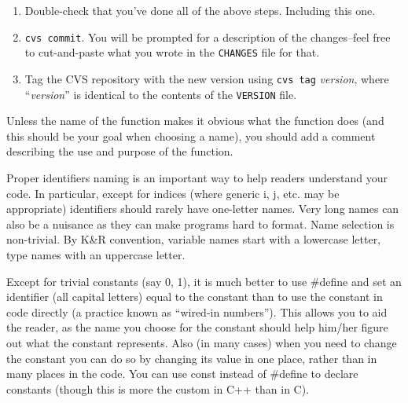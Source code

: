 \documentclass{article}
\begin{document}
\begin{enumerate}
   \item Double-check that you've done all of the above steps.  Including
      this one.

   \item \texttt{cvs commit}.  You will be prompted for a description of the
      changes--feel free to cut-and-paste what you wrote in the
      \texttt{CHANGES} file for that.

   \item Tag the CVS repository with the new version using \texttt{cvs tag} \textit{version}, where ``\textit{version}'' is identical to the contents of the \texttt{VERSION} file.
\end{enumerate}






  Unless the name of the function makes it obvious what the function
  does (and this should be your goal when choosing a name), you should
  add a comment describing the use and purpose of the function.

  Proper identifiers naming is an important way to help readers
  understand your code.  In particular, except for indices (where
  generic i, j, etc. may be appropriate) identifiers should rarely
  have one-letter names.  Very long names can also be a nuisance as
  they can make programs hard to format.  Name selection is
  non-trivial. By K\&R convention, variable names start with a
  lowercase letter, type names with an uppercase letter.

%
Except for trivial constants (say 0, 1), it is much better to use
\#define and set an identifier (all capital letters) equal to the
constant than to use the constant in code directly (a practice known
as “wired-in numbers”).  This allows you to aid the reader, as the
name you choose for the constant should help him/her figure out what
the constant represents. Also (in many cases) when you need to change
the constant you can do so by changing its value in one place, rather
than in many places in the code.  You can use const instead of
\#define to declare constants (though this is more the custom in C++
than in C).
\end{document}
